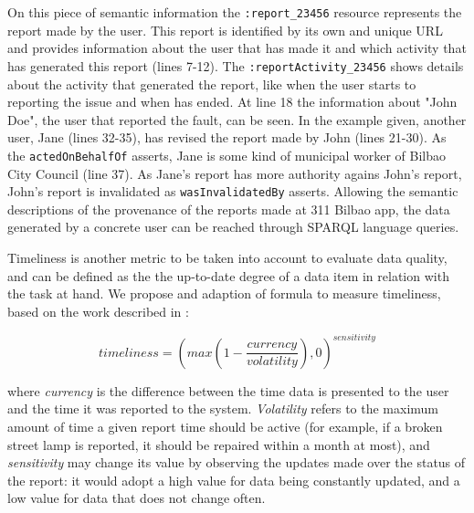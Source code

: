 On this piece of semantic information the \texttt{:report\_23456} resource represents the report made by the user. This report is identified by its own and unique URL and provides information about the user that has made it and which activity that has generated this report (lines 7-12). The \texttt{:reportActivity\_23456} shows details about the activity that generated the report, like when the user starts to reporting the issue and when has ended. At line 18 the information about "John Doe", the user that reported the fault, can be seen. In the example given, another user, Jane (lines 32-35), has revised the report made by John (lines 21-30). As the \texttt{actedOnBehalfOf} asserts, Jane is some kind of municipal worker of Bilbao City Council (line 37). As Jane's report has more authority agains John's report, John's report is invalidated as \texttt{wasInvalidatedBy} asserts. Allowing the semantic descriptions of the provenance of the reports made at 311 Bilbao app, the data generated by a concrete user can be reached through SPARQL \cite{prudhommeaux_sparql_2008} language queries.





Timeliness is another metric to be taken into account to evaluate data quality, and can be defined as the the up-to-date degree of a data item in relation with the task at hand. We propose and adaption of \cite{Hartig09usingweb} formula to measure timeliness, based on the work described in \cite{Ballou:1998:MIM:291329.291335}:

\begin{equation}
    timeliness = (max(1-\frac{currency}{volatility}), 0)^{sensitivity}
\end{equation}

where \emph{currency} is the difference between the time data is presented to the user and the time it was reported to the system. \emph{Volatility} refers to the maximum amount of time a given report time should be active (for example, if a broken street lamp is reported, it should be repaired within a month at most), and \emph{sensitivity} may change its value by observing the updates made over the status of the report: it would adopt a high value for data being constantly updated, and a low value for data that does not change often.


